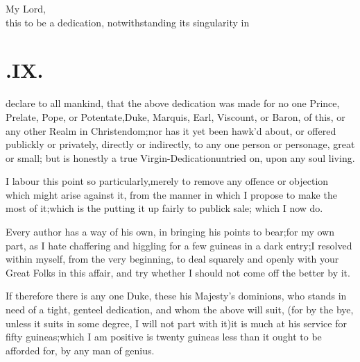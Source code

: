 \documentclass{article}
\begin{document}
My Lord,\\[-24pt]
 this to
be a dedication,\break
notwithstanding its singularity in\break
{}

\noindent{}
\vskip 36pt
\newpage
\null
\section{.\enspace IX.}

 declare to all mankind,
that the above dedication was made for no one Prince, Prelate,
Pope, or Potentate,\tsk  Duke, Marquis, Earl, Viscount, or Baron, of this, or any other Realm in
Christendom;\tsh  nor has it yet been hawk’d about, or
offered publickly or privately, directly or indirectly, to any one
person or personage, great or small; but is honestly a true
Virgin-Dedication\break untried on, upon any soul living.

I labour this point so particularly,\break merely to remove any
offence or objection which might arise against it, from the manner
in which I propose to make the most of it;\tsk  which is the
putting it up fairly to publick sale; which I now do.

\tsh  Every author has a way of his
own, in bringing his points to bear;\tsk  for
my own part, as I hate chaffering and
higgling for a few guineas in a dark\break
entry;\tsk  I resolved within myself, from
the very beginning, to deal squarely and 
openly with your Great Folks in this affair, 
and try whether I should not come
off the better by it.

If therefore there is any one Duke, 
{these his Majesty’s dominions, who stands}
{in need of a tight, genteel dedication,}
{and whom the above will suit, (for by}
{the bye, unless it suits in some degree, I}
{will not part with it)\tsh  it is much at}
his service for fifty guineas;\tsh  which
I am positive is twenty guineas less
than it ought to be afforded for, by any man of genius.
\end{document}
